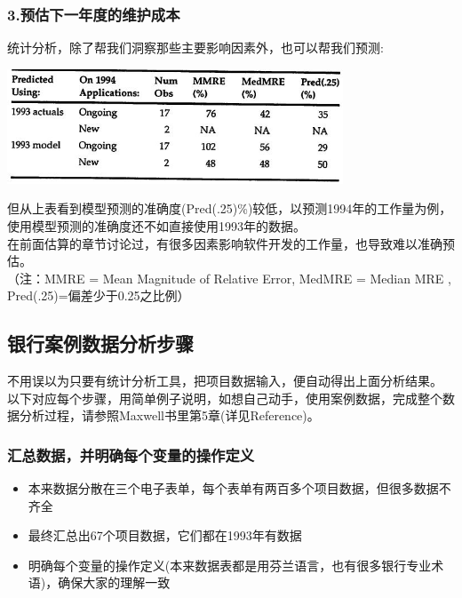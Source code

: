 \hypertarget{ux9884ux4f30ux4e0bux4e00ux5e74ux5ea6ux7684ux7ef4ux62a4ux6210ux672c}{%
\subsubsection{3.预估下一年度的维护成本}\label{ux9884ux4f30ux4e0bux4e00ux5e74ux5ea6ux7684ux7ef4ux62a4ux6210ux672c}}

统计分析，除了帮我们洞察那些主要影响因素外，也可以帮我们预测:


\includegraphics[width=10cm]{maxwell_t55.jpg}

但从上表看到模型预测的准确度(Pred(.25)\%)较低，以预测1994年的工作量为例，使用模型预测的准确度还不如直接使用1993年的数据。\\
在前面估算的章节讨论过，有很多因素影响软件开发的工作量，也导致难以准确预估。\\

（注：MMRE = Mean Magnitude of Relative Error, MedMRE = Median MRE ,
Pred(.25)=偏差少于0.25之比例）

\hypertarget{ux6570ux636eux5206ux6790ux6b65ux9aa4}{%
\subsection{银行案例数据分析步骤}\label{ux6570ux636eux5206ux6790ux6b65ux9aa4}}

不用误以为只要有统计分析工具，把项目数据输入，便自动得出上面分析结果。
以下对应每个步骤，用简单例子说明，如想自己动手，使用案例数据，完成整个数据分析过程，请参照Maxwell书里第5章(详见Reference)。

\hypertarget{ux6c47ux603bux6570ux636eux5e76ux660eux786eux6bcfux4e2aux53d8ux91cfux7684ux64cdux4f5cux5b9aux4e49}{%
\subsubsection{汇总数据，并明确每个变量的操作定义}\label{ux6c47ux603bux6570ux636eux5e76ux660eux786eux6bcfux4e2aux53d8ux91cfux7684ux64cdux4f5cux5b9aux4e49}}

\begin{itemize}
\tightlist
\item
  本来数据分散在三个电子表单，每个表单有两百多个项目数据，但很多数据不齐全
\item
  最终汇总出67个项目数据，它们都在1993年有数据
\item
  明确每个变量的操作定义(本来数据表都是用芬兰语言，也有很多银行专业术语)，确保大家的理解一致
\end{itemize}

